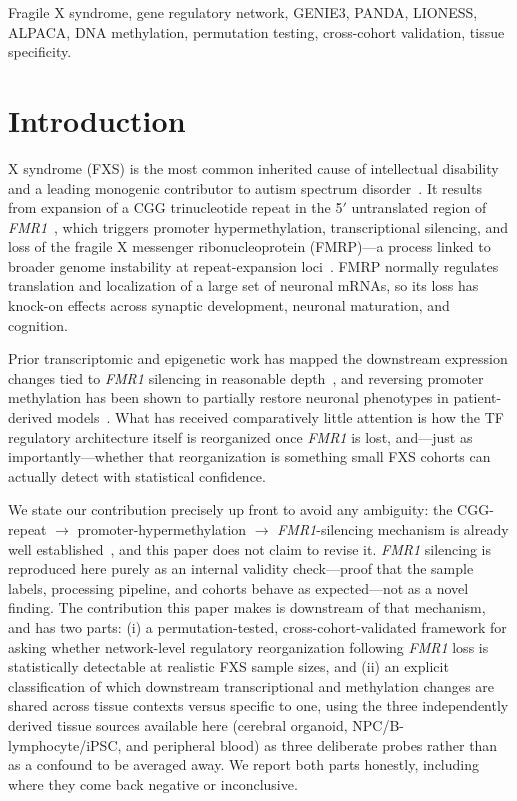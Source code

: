 \documentclass[journal]{IEEEtran}
\newcommand{\gene}[1]{\textit{#1}}
\begin{document}
\begin{IEEEkeywords}
Fragile X syndrome, gene regulatory network, GENIE3, PANDA, LIONESS, ALPACA, DNA methylation, permutation testing, cross-cohort validation, tissue specificity.
\end{IEEEkeywords}

\section{Introduction}
 X syndrome (FXS) is the most common inherited cause of intellectual disability and a leading monogenic contributor to autism spectrum disorder~\cite{santoro2012}. It results from expansion of a CGG trinucleotide repeat in the 5$'$ untranslated region of \gene{FMR1}~\cite{peprah2012}, which triggers promoter hypermethylation, transcriptional silencing, and loss of the fragile X messenger ribonucleoprotein (FMRP)---a process linked to broader genome instability at repeat-expansion loci~\cite{hayward2021}. FMRP normally regulates translation and localization of a large set of neuronal mRNAs, so its loss has knock-on effects across synaptic development, neuronal maturation, and cognition.

Prior transcriptomic and epigenetic work has mapped the downstream expression changes tied to \gene{FMR1} silencing in reasonable depth~\cite{li2020,malachowski2023}, and reversing promoter methylation has been shown to partially restore neuronal phenotypes in patient-derived models~\cite{liu2018,brykczynska2016}. What has received comparatively little attention is how the TF regulatory architecture itself is reorganized once \gene{FMR1} is lost, and---just as importantly---whether that reorganization is something small FXS cohorts can actually detect with statistical confidence.

We state our contribution precisely up front to avoid any ambiguity: the CGG-repeat $\rightarrow$ promoter-hypermethylation $\rightarrow$ \gene{FMR1}-silencing mechanism is already well established~\cite{peprah2012,hayward2021,liu2018,brykczynska2016}, and this paper does not claim to revise it. \gene{FMR1} silencing is reproduced here purely as an internal validity check---proof that the sample labels, processing pipeline, and cohorts behave as expected---not as a novel finding. The contribution this paper makes is downstream of that mechanism, and has two parts: (i) a permutation-tested, cross-cohort-validated framework for asking whether network-level regulatory reorganization following \gene{FMR1} loss is statistically detectable at realistic FXS sample sizes, and (ii) an explicit classification of which downstream transcriptional and methylation changes are shared across tissue contexts versus specific to one, using the three independently derived tissue sources available here (cerebral organoid, NPC/B-lymphocyte/iPSC, and peripheral blood) as three deliberate probes rather than as a confound to be averaged away. We report both parts honestly, including where they come back negative or inconclusive.
\end{document}
